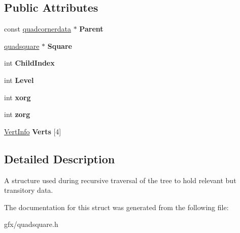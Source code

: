 \subsection*{Public Attributes}
\begin{DoxyCompactItemize}
\item 
const \hyperlink{structquadcornerdata}{quadcornerdata} $\ast$ {\bfseries Parent}\hypertarget{structquadcornerdata_a1e539a59ab876c051e20a1cdbc02e8c1}{}\label{structquadcornerdata_a1e539a59ab876c051e20a1cdbc02e8c1}

\item 
\hyperlink{classquadsquare}{quadsquare} $\ast$ {\bfseries Square}\hypertarget{structquadcornerdata_a2e59aa6dec019e88fb61c411db0968bf}{}\label{structquadcornerdata_a2e59aa6dec019e88fb61c411db0968bf}

\item 
int {\bfseries Child\+Index}\hypertarget{structquadcornerdata_aa571abf34b814cce1b1d1c9d40f36333}{}\label{structquadcornerdata_aa571abf34b814cce1b1d1c9d40f36333}

\item 
int {\bfseries Level}\hypertarget{structquadcornerdata_adc406b5bcfce253024c47ee07b44a5a8}{}\label{structquadcornerdata_adc406b5bcfce253024c47ee07b44a5a8}

\item 
int {\bfseries xorg}\hypertarget{structquadcornerdata_ae9e24edb0820b52e42dda6318b329bf3}{}\label{structquadcornerdata_ae9e24edb0820b52e42dda6318b329bf3}

\item 
int {\bfseries zorg}\hypertarget{structquadcornerdata_a07b9b9eb14caddc0ded6e3ab4d02bf1b}{}\label{structquadcornerdata_a07b9b9eb14caddc0ded6e3ab4d02bf1b}

\item 
\hyperlink{structVertInfo}{Vert\+Info} {\bfseries Verts} \mbox{[}4\mbox{]}\hypertarget{structquadcornerdata_a2bfc34e5730dc074a8fca16e295e5d5e}{}\label{structquadcornerdata_a2bfc34e5730dc074a8fca16e295e5d5e}

\end{DoxyCompactItemize}


\subsection{Detailed Description}
A structure used during recursive traversal of the tree to hold relevant but transitory data. 

The documentation for this struct was generated from the following file\+:\begin{DoxyCompactItemize}
\item 
gfx/quadsquare.\+h\end{DoxyCompactItemize}
